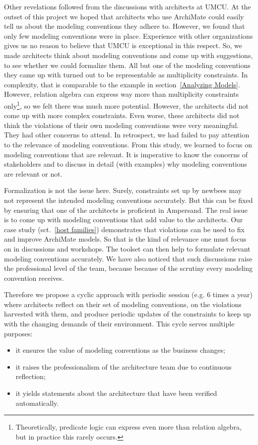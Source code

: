 \documentclass[sn-vancouver]{sn-jnl}%
\theoremstyle{thmstyleone}%
\theoremstyle{thmstyletwo}%
\theoremstyle{thmstylethree}%
\begin{document}
Other revelations followed from the discussions with architects at UMCU.
At the outset of this project we hoped that architects who use ArchiMate could easily tell us about the modeling conventions they adhere to.
However, we found that only few modeling conventions were in place.
Experience with other organizations gives us no reason to believe that UMCU is exceptional in this respect.
So, we made architects think about modeling conventions and come up with suggestions,
to see whether we could formalize them.
All but one of the modeling conventions they came up with turned out to be representable as multiplicity constraints.
In complexity, that is comparable to the example in section~\ref{Analyzing Models}.
However, relation algebra can express way more than multiplicity constraints only\footnote{Theoretically, predicate logic can express even more than relation algebra, but in practice this rarely occurs.}, so we felt there was much more potential.
However, the architects did not come up with more complex constraints.
Even worse, these architects did not think the violations of their own modeling conventions were very meaningful.
They had other concerns to attend.
In retrospect, we had failed to pay attention to the relevance of modeling conventions.
From this study, we learned to focus on modeling conventions that are relevant.
It is imperative to know the concerns of stakeholders and to discuss in detail (with examples) why modeling conventions are relevant or not.

Formalization is not the issue here.
Surely, constraints set up by newbees may not represent the intended modeling conventions accurately.
But this can be fixed by ensuring that one of the architects is proficient in Ampersand.
The real issue is to come up with modeling conventions that add value to the architects.
Our case study (sct.~\ref{host families}) demonstrates that violations can be used to fix and improve ArchiMate models.
So that is the kind of relevance one must focus on in discussions and workshops.
The toolset can then help to formulate relevant modeling conventions accurately.
We have also noticed that such discussions raise the professional level of the team,
because because of the scrutiny every modeling convention receives.

Therefore we propose a cyclic approach with periodic session (e.g. 6 times a year) where architects reflect on their set of modeling conventions,
on the violations harvested with them, and produce periodic updates of the constraints to keep up with the changing demands of their environment.
This cycle serves multiple purposes:
\begin{itemize}
   \item it ensures the value of modeling conventions as the business changes;
   \item it raises the professionalism of the architecture team due to continuous reflection;
   \item it yields statements about the architecture that have been verified automatically.
\end{itemize}
\end{document}
